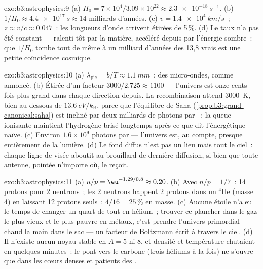 \begin{solution}{exo:b3:astrophysics:9}
(a) $H_0 = 7\times10^4/3.09\times10^{22} \approx
\qty{2.3e-18}{s^{-1}}$. (b) $1/H_0 \approx \qty{4.4e17}{s}
\approx 14$ milliards d'années. (c) $v = \qty{1.4e4}{km/s}$~;
$z \approx v/c \approx 0.047$~: les longueurs d'onde arrivent
étirées de 5\,\%. (d) Le taux n'a pas été constant --- ralenti tôt
par la matière, accéléré depuis par l'énergie sombre~: que
$1/H_0$ tombe tout de même à un milliard d'années des 13,8 vrais est
une petite coïncidence cosmique.
\end{solution}

\begin{solution}{exo:b3:astrophysics:10}
(a) $\lambda_{\text{pic}} = b/T \approx \qty{1.1}{mm}$~: des
micro-ondes, comme annoncé. (b) Étirée d'un facteur $3000/2.725 \approx
1100$ --- l'univers est onze cents fois plus grand dans chaque
direction depuis. La recombinaison attend \qty{3000}{K}, bien
au-dessous de $\qty{13.6}{eV}/k_{\text{B}}$, parce que l'équilibre de
Saha (\cref{prop:b3:grand-canonical:saha}) est incliné par deux
milliards de photons par ~: la queue ionisante maintient
l'hydrogène brisé longtemps après ce que dit l'énergétique naïve.
(c) Environ $1.6\times10^{9}$ photons par  --- l'univers est,
au compte, presque entièrement de la lumière. (d) Le fond diffus
n'est pas un lieu mais tout le ciel~: chaque ligne de visée aboutit
au brouillard de dernière diffusion, si bien que toute antenne,
pointée n'importe où, le reçoit.
\end{solution}

\begin{solution}{exo:b3:astrophysics:11}
(a) $n/p = \eu^{-1.29/0.8} \approx 0.20$. (b) Avec $n/p = 1/7$~:
14 protons pour 2 neutrons~; les 2 neutrons happent 2 protons dans un
$^4$He (masse 4) en laissant 12 protons seuls~: $4/16 = 25\,\%$ en
masse. (c) Aucune étoile n'a eu le temps de changer un quart de tout
en hélium~; trouver ce plancher dans le gaz le plus vieux et le plus
pauvre en métaux, c'est prendre l'univers primordial chaud la main
dans le sac --- un facteur de Boltzmann écrit à travers le ciel. (d)
Il n'existe aucun noyau stable en $A = 5$ ni $8$, et densité et
température chutaient en quelques minutes~: le pont vers le carbone
(trois héliums à la fois) ne s'ouvre que dans les cœurs denses et
patients des .
\end{solution}

